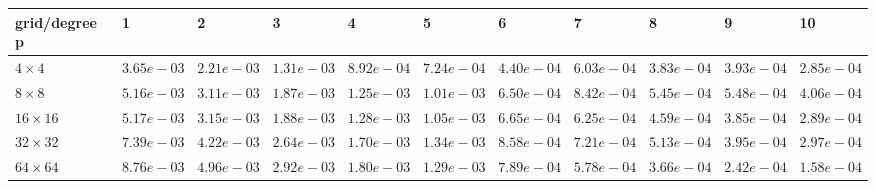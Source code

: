 \begin{tabular}{lllllllllll}
\hline
 grid/degree p   & 1          & 2          & 3          & 4          & 5          & 6          & 7          & 8          & 9          & 10         \\
\hline
 $4 \times 4$    & $3.65e-03$ & $2.21e-03$ & $1.31e-03$ & $8.92e-04$ & $7.24e-04$ & $4.40e-04$ & $6.03e-04$ & $3.83e-04$ & $3.93e-04$ & $2.85e-04$ \\
 $8 \times 8$    & $5.16e-03$ & $3.11e-03$ & $1.87e-03$ & $1.25e-03$ & $1.01e-03$ & $6.50e-04$ & $8.42e-04$ & $5.45e-04$ & $5.48e-04$ & $4.06e-04$ \\
 $16 \times 16$  & $5.17e-03$ & $3.15e-03$ & $1.88e-03$ & $1.28e-03$ & $1.05e-03$ & $6.65e-04$ & $6.25e-04$ & $4.59e-04$ & $3.85e-04$ & $2.89e-04$ \\
 $32 \times 32$  & $7.39e-03$ & $4.22e-03$ & $2.64e-03$ & $1.70e-03$ & $1.34e-03$ & $8.58e-04$ & $7.21e-04$ & $5.13e-04$ & $3.95e-04$ & $2.97e-04$ \\
 $64 \times 64$  & $8.76e-03$ & $4.96e-03$ & $2.92e-03$ & $1.80e-03$ & $1.29e-03$ & $7.89e-04$ & $5.78e-04$ & $3.66e-04$ & $2.42e-04$ & $1.58e-04$ \\
\hline
\end{tabular}